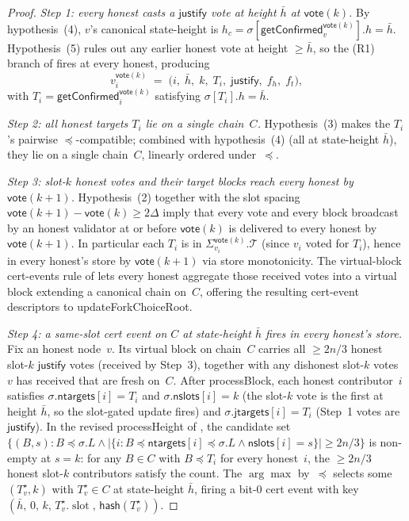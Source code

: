 \documentclass{article}
\newcommand{\slot}[0]{\ensuremath{\operatorname{\mathrm{slot}}}}
\newcommand{\just}{\ensuremath{\mathsf{justify}}\xspace}
\newcommand{\jtargets}{\mathsf{jtargets}}
\newcommand{\ntargets}{\mathsf{ntargets}}
\newcommand{\nslots}{\mathsf{nslots}}
\newcommand{\hash}{\mathsf{hash}}
\newcommand{\vote}{\mathsf{vote}}
\newcommand{\comm}[1]{\bar{#1}}
\newcommand{\processBlock}{\textsf{processBlock}\xspace}
\newcommand{\processHeight}{\textsf{processHeight}\xspace}
\newcommand{\updateForkChoiceRoot}{\textsf{updateForkChoiceRoot}\xspace}
\newcommand{\getConfirmed}{\textsf{getConfirmed}\xspace}
\theoremstyle{plain}
\theoremstyle{definition}
\theoremstyle{remark}
\begin{document}
\begin{proof}
\emph{Step 1: every honest casts a \just vote at height $\comm{h}$ at $\vote(k)$.}
By hypothesis~(4), $v$'s canonical state-height is $h_c = \sigma[\getConfirmed_v^{\vote(k)}].h = \comm{h}$.
Hypothesis~(5) rules out any earlier honest vote at height $\geq \comm{h}$, so the (R1) branch of  fires at every honest, producing
\[
  v^{\vote(k)}_i \;=\; \bigl(i,\; \comm{h},\; k,\; T_i,\; \just,\; f_h,\; f_t\bigr),
\]
with $T_i = \getConfirmed_i^{\vote(k)}$ satisfying $\sigma[T_i].h = \comm{h}$.

\emph{Step 2: all honest targets $T_i$ lie on a single chain~$C$.}
Hypothesis~(3) makes the $T_i$'s pairwise $\preceq$-compatible; combined with hypothesis~(4) (all at state-height $\comm{h}$), they lie on a single chain~$C$, linearly ordered under~$\preceq$.

\emph{Step 3: slot-$k$ honest votes and their target blocks reach every honest by $\vote(k+1)$.}
Hypothesis~(2) together with the slot spacing $\vote(k+1) - \vote(k) \geq 2\Delta$ imply that every vote and every block broadcast by an honest validator at or before $\vote(k)$ is delivered to every honest by $\vote(k+1)$.
In particular each $T_i$ is in $\Sigma_{v_i}^{\vote(k)}.\mathcal{T}$ (since $v_i$ voted for $T_i$), hence in every honest's store by $\vote(k+1)$ via store monotonicity.
The virtual-block cert-events rule of  lets every honest aggregate those received votes into a virtual block extending a canonical chain on~$C$, offering the resulting cert-event descriptors to \updateForkChoiceRoot.

\emph{Step 4: a same-slot cert event on $C$ at state-height $\comm{h}$ fires in every honest's store.}
Fix an honest node~$v$. Its virtual block on chain~$C$ carries all $\geq 2n/3$ honest slot-$k$ \just votes (received by Step~3), together with any dishonest slot-$k$ votes $v$ has received that are fresh on~$C$.
After \processBlock{}, each honest contributor~$i$ satisfies $\sigma.\ntargets[i] = T_i$ and $\sigma.\nslots[i] = k$ (the slot-$k$ vote is the first at height $\comm{h}$, so the slot-gated update fires) and $\sigma.\jtargets[i] = T_i$ (Step~1 votes are \just).
In the revised \processHeight{} of , the candidate set $\{(B, s) : B \preceq \sigma.L \wedge |\{i : B \preceq \ntargets[i] \preceq \sigma.L \wedge \nslots[i] = s\}| \geq 2n/3\}$ is non-empty at $s = k$: for any $B \in C$ with $B \preceq T_i$ for every honest~$i$, the $\geq 2n/3$ honest slot-$k$ contributors satisfy the count. The $\arg\max$ by~$\preceq$ selects some $(T^\star_v, k)$ with $T^\star_v \in C$ at state-height $\comm{h}$, firing a bit-$0$ cert event with key $(\comm{h},\, 0,\, k,\, T^\star_v.\slot,\, \hash(T^\star_v))$.


\end{proof}
\end{document}
